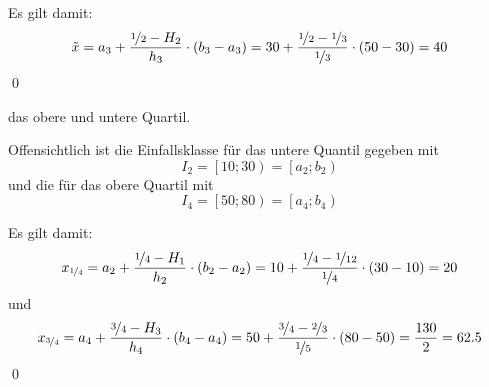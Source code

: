 \documentclass{abgabe}
\begin{document}
\begin{questions}
\begin{parts}
\begin{subparts}
\begin{solution}
                Es gilt damit:
                \[
                    \tilde{x} = a_3 + \frac{\nicefrac{1}{2} - H_2}{h_3} \cdot (b_3 - a_3) = 30 + \frac{\nicefrac{1}{2} - \nicefrac{1}{3}}{\nicefrac{1}{3}}  \cdot (50 - 30) = 40
                \]
                \qed
            \end{solution}

            \subpart
            das obere und untere Quartil.
            \begin{solution}
                Offensichtlich ist die Einfallsklasse für das untere Quantil gegeben mit
                \[
                    I_2 = \left[ 10 ; 30 \right) = \left[ a_2 ; b_2 \right)
                \]
                und die für das obere Quartil mit
                \[
                    I_4 = \left[ 50 ; 80 \right) = \left[ a_4 ; b_4 \right)
                \]

                Es gilt damit:
                \[
                    x_{\nicefrac{1}{4}} = a_2 + \frac{\nicefrac{1}{4} - H_1}{h_2} \cdot (b_2 - a_2) = 10 + \frac{\nicefrac{1}{4} - \nicefrac{1}{12}}{\nicefrac{1}{4}} \cdot (30 - 10) = 20
                \]
                und
                \[
                    x_{\nicefrac{3}{4}} = a_4 + \frac{\nicefrac{3}{4} - H_3}{h_4} \cdot (b_4 - a_4) = 50 + \frac{\nicefrac{3}{4} - \nicefrac{2}{3}}{\nicefrac{1}{5}} \cdot (80 - 50) = \frac{130}{2} = 62.5
                \]
                \qed
            \end{solution}
        \end{subparts}

    \end{parts}
\end{questions}
\end{document}
